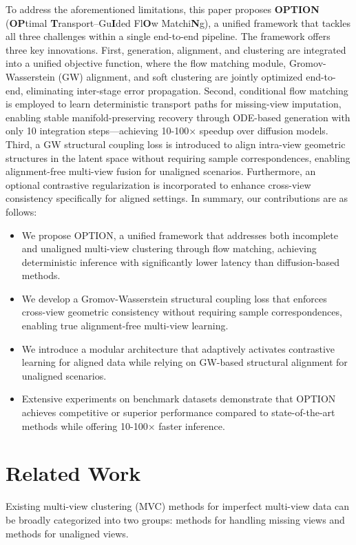 \documentclass{article}
\theoremstyle{plain}
\theoremstyle{definition}
\theoremstyle{remark}
\begin{document}
To address the aforementioned limitations, this paper proposes \textbf{OPTION} (\textbf{OP}timal \textbf{T}ransport–Gu\textbf{I}ded Fl\textbf{O}w Matchi\textbf{N}g), a unified framework that tackles all three challenges within a single end-to-end pipeline. The framework offers three key innovations. First, generation, alignment, and clustering are integrated into a unified objective function, where the flow matching module, Gromov-Wasserstein (GW) alignment, and soft clustering are jointly optimized end-to-end, eliminating inter-stage error propagation. Second, conditional flow matching \cite{lipmanFlowMatchingGenerative2023a} is employed to learn deterministic transport paths for missing-view imputation, enabling stable manifold-preserving recovery through ODE-based generation with only 10 integration steps---achieving 10-100$\times$ speedup over diffusion models. Third, a GW structural coupling loss is introduced to align intra-view geometric structures in the latent space without requiring sample correspondences, enabling alignment-free multi-view fusion for unaligned scenarios. Furthermore, an optional contrastive regularization is incorporated to enhance cross-view consistency specifically for aligned settings.
In summary, our contributions are as follows:
\begin{itemize}
    \item We propose OPTION, a unified framework that addresses both incomplete and unaligned multi-view clustering through flow matching, achieving deterministic inference with significantly lower latency than diffusion-based methods.
    \item We develop a Gromov-Wasserstein structural coupling loss that enforces cross-view geometric consistency without requiring sample correspondences, enabling true alignment-free multi-view learning.
    \item We introduce a modular architecture that adaptively activates contrastive learning for aligned data while relying on GW-based structural alignment for unaligned scenarios.
    \item Extensive experiments on benchmark datasets demonstrate that OPTION achieves competitive or superior performance compared to state-of-the-art methods while offering 10-100$\times$ faster inference.
\end{itemize}

\section{Related Work}\label{related-work}
Existing multi-view clustering (MVC) methods for imperfect multi-view data can be broadly categorized into two groups: methods for handling missing views and methods for unaligned views.
\end{document}
